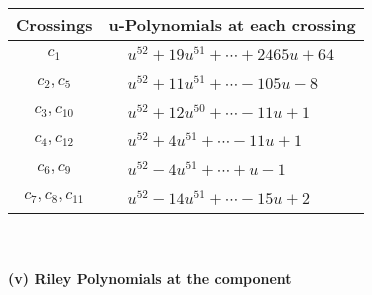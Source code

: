 \documentclass[1p]{elsarticle_modified}
\theoremstyle{definition}
\begin{document}
\begin{tabular}{m{50pt}|m{274pt}}
Crossings & \hspace{64pt}u-Polynomials at each crossing \\
\hline $$\begin{aligned}c_{1}\end{aligned}$$&$\begin{aligned}
&u^{52}+19 u^{51}+\cdots+2465 u+64
\end{aligned}$\\
\hline $$\begin{aligned}c_{2},c_{5}\end{aligned}$$&$\begin{aligned}
&u^{52}+11 u^{51}+\cdots-105 u-8
\end{aligned}$\\
\hline $$\begin{aligned}c_{3},c_{10}\end{aligned}$$&$\begin{aligned}
&u^{52}+12 u^{50}+\cdots-11 u+1
\end{aligned}$\\
\hline $$\begin{aligned}c_{4},c_{12}\end{aligned}$$&$\begin{aligned}
&u^{52}+4 u^{51}+\cdots-11 u+1
\end{aligned}$\\
\hline $$\begin{aligned}c_{6},c_{9}\end{aligned}$$&$\begin{aligned}
&u^{52}-4 u^{51}+\cdots+u-1
\end{aligned}$\\
\hline $$\begin{aligned}c_{7},c_{8},c_{11}\end{aligned}$$&$\begin{aligned}
&u^{52}-14 u^{51}+\cdots-15 u+2
\end{aligned}$\\
\hline
\end{tabular}\\~\\
\newpage\renewcommand{\arraystretch}{1}
\flushleft \textbf{(v) Riley Polynomials at the component}\newline \\
\end{document}
